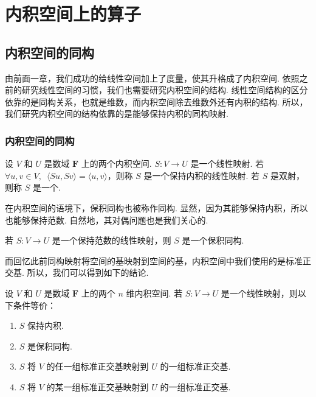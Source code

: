 \chapter{内积空间上的算子}

\section{内积空间的同构}

由前面一章，我们成功的给线性空间加上了度量，使其升格成了内积空间. 依照之前的研究线性空间的习惯，我们也需要研究内积空间的结构. 线性空间结构的区分依靠的是同构关系，也就是维数，而内积空间除去维数外还有内积的结构. 所以，我们研究内积空间的结构依靠的是能够保持内积的同构映射.

\subsection{内积空间的同构}

\begin{definition}
    设 $ V $ 和 $ U $ 是数域 $ \mathbf{F} $ 上的两个内积空间. $ S: V \rightarrow U $ 是一个线性映射. 若 $ \forall u, v \in V,\enspace \langle Su, Sv \rangle = \langle u, v \rangle $，则称 $ S $ 是一个保持内积的线性映射. 若 $ S $ 是双射，则称 $ S $ 是一个.
\end{definition}

在内积空间的语境下，保积同构也被称作同构. 显然，因为其能够保持内积，所以也能够保持范数. 自然地，其对偶问题也是我们关心的.

\begin{theorem}
    若 $ S : V \rightarrow U $ 是一个保持范数的线性映射，则 $ S $ 是一个保积同构.
\end{theorem}

而回忆此前同构映射将空间的基映射到空间的基，内积空间中我们使用的是标准正交基. 所以，我们可以得到如下的结论.

\begin{theorem}
    设 $ V $ 和 $ U $ 是数域 $ \mathbf{F} $ 上的两个 $ n $ 维内积空间. 若 $ S : V \rightarrow U $ 是一个线性映射，则以下条件等价：
    \begin{enumerate}
        \item $ S $ 保持内积.
        \item $ S $ 是保积同构.
        \item $ S $ 将 $ V $ 的任一组标准正交基映射到 $ U $ 的一组标准正交基.
        \item $ S $ 将 $ V $ 的某一组标准正交基映射到 $ U $ 的一组标准正交基.
    \end{enumerate}
\end{theorem}

